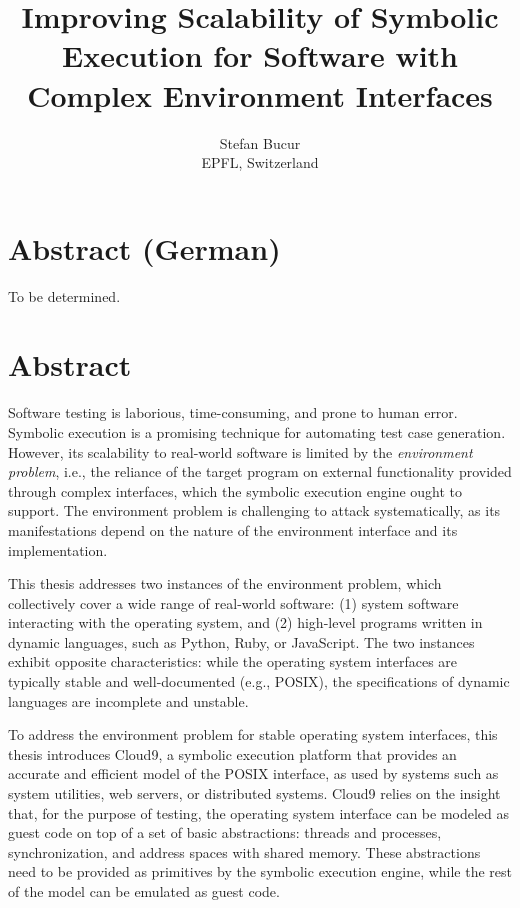 \documentclass[letterpaper,10pt,oneside]{book}
\newcommand{\thesistitle}{Improving Scalability of Symbolic Execution for Software with Complex Environment Interfaces}
\begin{document}
\date{}
\title{\thesistitle}
\author{Stefan Bucur \\ EPFL, Switzerland}

\maketitle

\chapter*{Abstract (German)}

To be determined.

\chapter*{Abstract}

Software testing is laborious, time-consuming, and prone to human error.  Symbolic execution is a promising technique for automating test case generation.  However, its scalability to real-world software is limited by the \emph{environment problem}, i.e., the reliance of the target program on external functionality provided through complex interfaces, which the symbolic execution engine ought to support.
%
The environment problem is challenging to attack systematically, as its manifestations depend on the nature of the environment interface and its implementation.

This thesis addresses two instances of the environment problem, which collectively cover a wide range of real-world software: (1) system software interacting with the operating system, and (2) high-level programs written in dynamic languages, such as Python, Ruby, or JavaScript.  The two instances exhibit opposite characteristics: while the operating system interfaces are typically stable and well-documented (e.g., POSIX), the specifications of dynamic languages are incomplete and unstable.

To address the environment problem for stable operating system interfaces, this thesis introduces Cloud9, a symbolic execution platform that provides an accurate and efficient model of the POSIX interface, as used by systems such as system utilities, web servers, or distributed systems.
%
Cloud9 relies on the insight that, for the purpose of testing, the operating system interface can be modeled as guest code on top of a set of basic abstractions: threads and processes, synchronization, and address spaces with shared memory. These abstractions need to be provided as primitives by the symbolic execution engine, while the rest of the model can be emulated as guest code.
\end{document}
